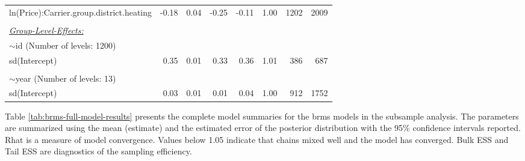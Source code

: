 \documentclass[12pt,twoside]{reedthesis}
\begin{document}
\begin{longtable}[c]{lrrrrrrr}
ln(Price):Carrier.group.district.heating & -0.18 & 0.04 & -0.25 & -0.11 & 1.00 & 1202 & 2009 \\
 &  &  &  &  &  &  &  \\
{\ul \textit{Group-Level-Effects:}} &  &  &  &  &  &  &  \\
$\sim$id (Number of levels: 1200) &  &  &  &  &  &  &  \\
sd(Intercept) & 0.35 & 0.01 & 0.33 & 0.36 & 1.01 & 386 & 687 \\
 &  &  &  &  &  &  &  \\
$\sim$year (Number of levels: 13) &  &  &  &  &  &  &  \\
sd(Intercept) & 0.03 & 0.01 & 0.01 & 0.04 & 1.00 & 912 & 1752 \\ \hline
\end{longtable}
\normalsize

\noindent
Table \ref{tab:brms-full-model-results} presents the complete model summaries for the brms models in the subsample analysis. The parameters are summarized using the mean (estimate) and the estimated error of the posterior distribution with the 95\% confidence intervals reported. Rhat is a measure of model convergence. Values below 1.05 indicate that chains mixed well and the model has converged. Bulk ESS and Tail ESS are diagnostics of the sampling efficiency.
\end{document}
